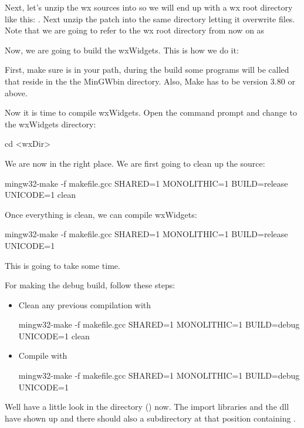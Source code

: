 Next, let's unzip the wx sources into  so we will end up with a wx root directory like this: . Next unzip the patch into the same directory letting it overwrite files. Note that we are going to refer to the wx root directory from now on as 

Now, we are going to build the wxWidgets. This is how we do it:

First, make sure  is in your path, during the build some programs will be called that reside in the the MinGW\osp bin directory. Also, Make has to be version 3.80 or above.

Now it is time to compile wxWidgets. Open the command prompt and change to the wxWidgets directory:

\begin{cmd}
cd <wxDir>\build\msw
\end{cmd}

We are now in the right place. We are first going to clean up the source:

\begin{cmd}
mingw32-make -f makefile.gcc SHARED=1 MONOLITHIC=1 BUILD=release UNICODE=1 clean
\end{cmd}

Once everything is clean, we can compile wxWidgets:

\begin{cmd}
mingw32-make -f makefile.gcc SHARED=1 MONOLITHIC=1 BUILD=release UNICODE=1
\end{cmd}

This is going to take some time.

For making the debug build, follow these steps:

\begin{itemize}
\item Clean any previous compilation with
	\begin{cmd}
	mingw32-make -f makefile.gcc SHARED=1 MONOLITHIC=1 BUILD=debug UNICODE=1 clean
	\end{cmd}
\item Compile with
	\begin{cmd}
	mingw32-make -f makefile.gcc SHARED=1 MONOLITHIC=1 BUILD=debug UNICODE=1
	\end{cmd}
\end{itemize}

Well have a little look in the directory () now. The import libraries and the dll have shown up and there should also a  subdirectory at that position containing .

